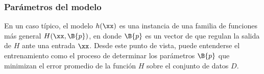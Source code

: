 %
\subsubsection{Parámetros del modelo}
%
En un caso típico, el modelo $h(\xx)$ es una instancia 
de una familia de funciones más general $H(\xx,\B{p})$, 
en donde $\B{p}$ es un vector de  que regulan la salida de 
$H$ ante una entrada $\xx$.
Desde este punto de vista, puede entenderse el {entrenamiento} como el
proceso de determinar los parámetros $\B{p}$ que minimizan el error
promedio de la función $H$ sobre el conjunto de datos $D$.
